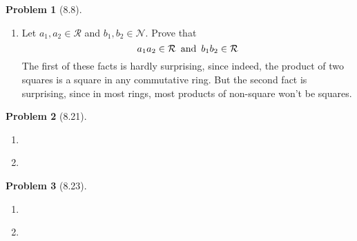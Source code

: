 \documentclass[12pt]{article}
\theoremstyle{definition}
\newtheorem{problem}{Problem}
\begin{document}
\begin{problem}[8.8]
\begin{enumerate}[label=(\alph*)]
\begin{solution}
        \end{solution}

        \item Let $a_1, a_2 \in \mathcal{R}$ and $b_1, b_2 \in \mathcal{N}$. Prove that
              \[
                a_1a_2 \in \mathcal{R} \hspace{5px} \text{and} \hspace{5px} b_1b_2 \in \mathcal{R}
              \]
              The first of these facts is hardly surprising, since indeed, the product of two squares is
              a square in any commutative ring. But the second fact is surprising, since in most rings, 
              most products of non-square won't be squares. 
        \begin{solution}

        \end{solution}
    \end{enumerate}
\end{problem}

\begin{problem}[8.21]
    \begin{enumerate}[label=(\alph*)]
        \item 
        \begin{solution}

        \end{solution}

        \item 
        \begin{solution}

        \end{solution}
    \end{enumerate}
\end{problem}

\begin{problem}[8.23]
    \begin{enumerate}[label=(\alph*)]
        \item 
        \begin{solution}

        \end{solution}

        \item 
        \begin{solution}

        \end{solution}
    \end{enumerate}
\end{problem}
\end{document}
